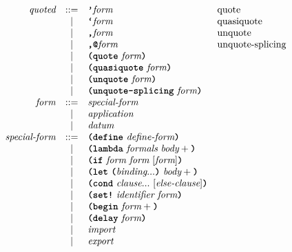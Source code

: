 \[\begin{array}{rcll}
\textit{quoted}         & ::= & \term{'} \textit{form}                                             & \text{quote} \\
                        & |   & \term{`} \textit{form}                                             & \text{quasiquote} \\
                        & |   & \term{,} \textit{form}                                             & \text{unquote} \\
                        & |   & \term{,@} \textit{form}                                            & \text{unquote-splicing} \\
                        & |   & \term{(}\term{quote} \ \textit{form}\term{)}                      & \\
                        & |   & \term{(}\term{quasiquote} \ \textit{form}\term{)}                 & \\
                        & |   & \term{(}\term{unquote} \ \textit{form}\term{)}                    & \\
                        & |   & \term{(}\term{unquote-splicing} \ \textit{form}\term{)}           & \\

\textit{form}           & ::= & \textit{special-form}                                               & \\
                        & |   & \textit{application}                                                & \\
                        & |   & \textit{datum}                                                      & \\

\textit{special-form}   & ::= & \term{(}\term{define} \ \textit{define-form}\term{)}              & \\
                        & |   & \term{(}\term{lambda} \ \textit{formals} \ \textit{body}+\term{)} & \\
                        & |   & \term{(}\term{if} \ \textit{form} \ \textit{form} \ [\textit{form}] \term{)} & \\
                        & |   & \term{(}\term{let} \ \term{(}\textit{binding}...\term{)} \ \textit{body}+\term{)} & \\
                        & |   & \term{(}\term{cond} \ \textit{clause}... \ [\textit{else-clause}] \term{)} & \\
                        & |   & \term{(}\term{set!} \ \textit{identifier} \ \textit{form}\term{)} & \\
                        & |   & \term{(}\term{begin} \ \textit{form}+\term{)}                     & \\
                        & |   & \term{(}\term{delay} \ \textit{form}\term{)}                      & \\
                        & |   & \textit{import}                                                     & \\
                        & |   & \textit{export}                                                     & \\


\end{array}\]

